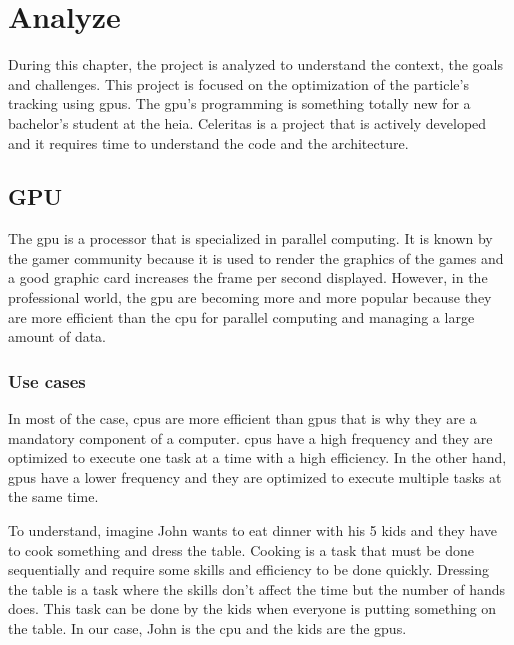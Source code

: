 \chapter{Analyze}
\label{ch:analyze}

During this chapter, the project is analyzed to understand the context, the
goals and challenges.
This project is focused on the optimization of the particle's tracking using
\acrshort{gpu}s.
The \acrshort{gpu}'s programming is something totally new for a bachelor's
student at the \acrshort{heia}.
Celeritas is a project that is actively developed and it requires time to
understand the code and the architecture.


\section{GPU}
\label{ch:analyze:gpu}

The \acrfull{gpu} is a processor that is specialized in parallel computing.
It is known by the gamer community because it is used to render the graphics of
the games and a good graphic card increases the frame per second displayed.
However, in the professional world, the \acrshort{gpu} are becoming more and
more popular because they are more efficient than the \acrshort{cpu} for
parallel computing and managing a large amount of data.


\subsection{Use cases}
\label{ch:analyze:gpu:use-cases}

In most of the case, \acrshort{cpu}s are more efficient than \acrshort{gpu}s
that is why they are a mandatory component of a computer.
\acrshort{cpu}s have a high frequency and they are optimized to execute one
task at a time with a high efficiency.
In the other hand, \acrshort{gpu}s have a lower frequency and they are optimized
to execute multiple tasks at the same time.

To understand, imagine John wants to eat dinner with his 5 kids and they have to
cook something and dress the table.
Cooking is a task that must be done sequentially and require some skills and
efficiency to be done quickly.
Dressing the table is a task where the skills don't affect the time but the
number of hands does.
This task can be done by the kids when everyone is putting something on the table.
In our case, John is the \acrshort{cpu} and the kids are the \acrshort{gpu}s.

